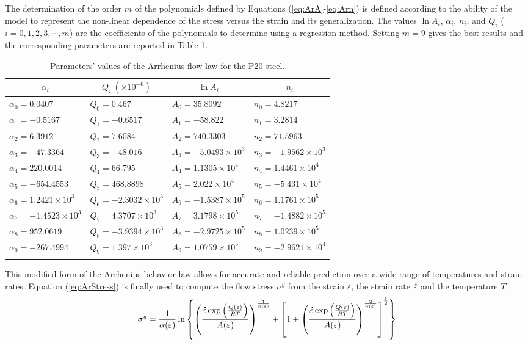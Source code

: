 \documentclass[twoside,english,1p,final,sort&compress]{elsarticle}
\theoremstyle{plain}
\DeclareRobustCommand{\mdot}[1]{\accentset{\mbox{\bfseries .}}{#1}}
\begin{document}
The determination of the order $m$ of the polynomials defined by Equations (\ref{eq:ArA}-\ref{eq:Arn}) is defined according to the ability of the model to represent the non-linear dependence of the stress versus the strain and its generalization.
The values $\ln\!A_i$, $\alpha_i$, $n_i$, and $Q_i$ ($i=0,1,2,3,\cdots,m$) are the coefficients of the polynomials to determine using a regression method.
Setting $m=9$ gives the best results and the corresponding parameters are reported in Table \ref{tab:AR}.
\begin{table}[h!]
\centering
\caption{Parameters' values of the Arrhenius flow law for the P20 steel.}
\begin{tabular}{llll}
\hline
\multicolumn{1}{c}{$\alpha_i$} & \multicolumn{1}{c}{$Q_i~(\times 10^{-6})$} & \multicolumn{1}{c}{$\ln\!A_i$} & \multicolumn{1}{c}{$n_i$}\\
\hline
$\alpha_0=0.0407$ & $Q_0=0.467$ & $A_0=35.8092$ & $n_0=4.8217$\\
$\alpha_1=-0.5167$ & $Q_1=-0.6517$ & $A_1=-58.822$ & $n_1=3.2814$\\
$\alpha_2=6.3912$ & $Q_2=7.6084$ & $A_2=740.3303$ & $n_2=71.5963$\\
$\alpha_3=-47.3364$ & $Q_3=-48.016$ & $A_3=-5.0493\times 10^{3}$ & $n_3=-1.9562\times 10^{3}$\\
$\alpha_4=220.0014$ & $Q_4=66.795$ & $A_4=1.1305\times 10^{4}$ & $n_4=1.4461\times 10^{4}$\\
$\alpha_5=-654.4553$ & $Q_5=468.8898$ & $A_5=2.022\times 10^{4}$ & $n_5=-5.431\times 10^{4}$\\
$\alpha_6=1.2421\times 10^{3}$ & $Q_6=-2.3032\times 10^{3}$ & $A_6=-1.5387\times 10^{5}$ & $n_6=1.1761\times 10^{5}$\\
$\alpha_7=-1.4523\times 10^{3}$ & $Q_7=4.3707\times 10^{3}$ & $A_7=3.1798\times 10^{5}$ & $n_7=-1.4882\times 10^{5}$\\
$\alpha_8=952.0619$ & $Q_8=-3.9394\times 10^{3}$ & $A_8=-2.9725\times 10^{5}$ & $n_8=1.0239\times 10^{5}$\\
$\alpha_9=-267.4994$ & $Q_9=1.397\times 10^{3}$ & $A_9=1.0759\times 10^{5}$ & $n_9=-2.9621\times 10^{4}$\\
\hline
\label{tab:AR}
\end{tabular}
\end{table}
This modified form of the Arrhenius behavior law allows for accurate and reliable prediction over a wide range of temperatures and strain rates.
Equation (\ref{eq:ArStress}) is finally used to compute the flow stress $\sigma^y$ from the strain $\varepsilon$, the strain rate $\mdot\varepsilon$ and the temperature $T$:
\begin{equation}
\sigma^y = \frac{1}{\alpha(\varepsilon)} \ln\left\{\left(\frac{\mdot\varepsilon \exp{\left(\frac{Q(\varepsilon)}{RT}\right)}}{A(\varepsilon)}\right)^{\frac{1}{n(\varepsilon)}} + \left[1 + \left(\frac{\mdot\varepsilon \exp{\left(\frac{Q(\varepsilon)}{RT}\right)}}{A(\varepsilon)}\right)^{\frac{2}{n(\varepsilon)}}\right]^{\frac{1}{2}}\right\}
\label{eq:ArStress}
\end{equation}
\end{document}
